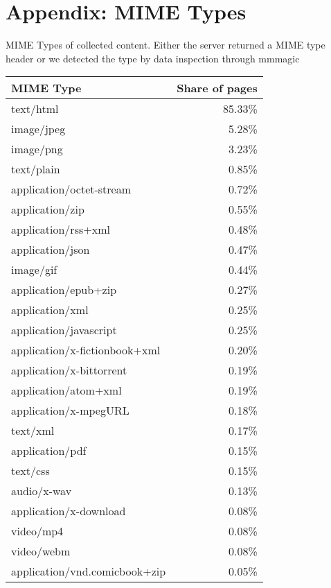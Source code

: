 %
%
\section{Appendix: MIME Types}
\label{appendix:A}
MIME Types of collected content. Either the server returned a MIME type header or we detected the type by data inspection through mmmagic\cite{mscdex}
\iflncs
\begin{multicols}{2}
	\begin{center}
	\label{table:mime types}
	\begin{supertabular}[H]{l|r}
	    \textbf{MIME Type} & \textbf{Share of pages}\\
		\hline
		\hline
		text/html			&	85.33\% \\
		\hline
		image/jpeg			&	5.28\% \\
		\hline
		image/png			&	3.23\% \\
		\hline
		text/plain			&	0.85\% \\
		\hline
		application/octet-stream		&	0.72\% \\
		\hline
		application/zip		&	0.55\% \\
		\hline
		application/rss+xml	&	0.48\% \\
		\hline
		application/json	&	0.47\% \\
		\hline
		image/gif			&	0.44\% \\
		\hline
		application/epub+zip			&	0.27\% \\
		\hline
		application/xml		&	0.25\% \\
		\hline
		application/javascript			&	0.25\% \\
		\hline
		application/x-fictionbook+xml	&	0.20\% \\
		\hline
		application/x-bittorrent		&	0.19\% \\
		\hline
		application/atom+xml			&	0.19\% \\
		\hline
		application/x-mpegURL			&	0.18\% \\
		\hline
		text/xml			&	0.17\% \\
		\hline
		application/pdf		&	0.15\% \\
		\hline
		text/css			&	0.15\% \\
		\hline
		audio/x-wav			&	0.13\% \\
		\hline
		application/x-download			&	0.08\% \\
		\hline
		video/mp4			&	0.08\% \\
		\hline
		video/webm			&	0.08\% \\
		\hline
		application/vnd.comicbook+zip	&	0.05\% \\

\end{supertabular}
\end{center}
\end{multicols}
